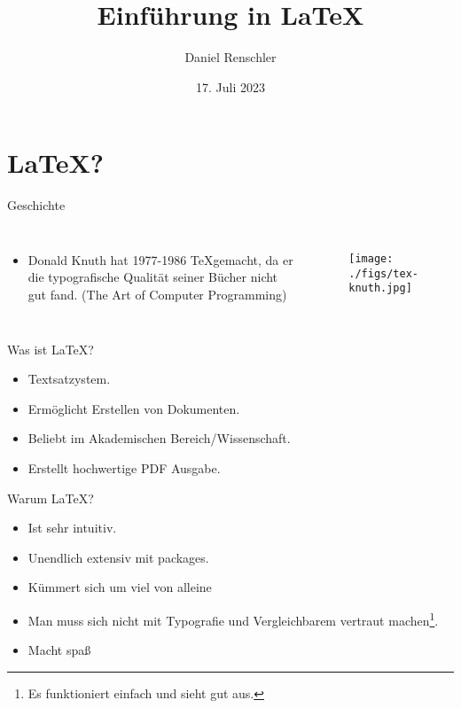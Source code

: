 \documentclass{beamer}
\title{Einf\"uhrung in \LaTeX}
\author{Daniel Renschler}
\date{17. Juli 2023}
\begin{document}
\begin{frame}
    \titlepage 
\end{frame}


\begin{frame}
    \tableofcontents
\end{frame}


\section{\LaTeX?}
\begin{frame}{Geschichte}
    \begin{columns}


    \begin{itemize}
        \item Donald Knuth hat 1977-1986 \TeX gemacht, da er die typografische Qualit\"at seiner B\"ucher nicht gut fand. (The Art of Computer Programming)

    \end{itemize}
        
        \hfill
        \begin{figure}[htpb]
            \centering
            \texttt{[image: ./figs/tex-knuth.jpg]}
        \end{figure}
    \end{columns}
\end{frame}

\begin{frame}{Was ist \LaTeX?}
    \begin{itemize}
        \item Textsatzystem.
        \item Erm\"oglicht Erstellen von Dokumenten.
        \item Beliebt im Akademischen Bereich/Wissenschaft.
        \item Erstellt hochwertige PDF Ausgabe.
    \end{itemize}
    
\end{frame}



\begin{frame}{Warum \LaTeX?}
    \begin{itemize}
        \item Ist sehr intuitiv.
        \item Unendlich extensiv mit packages.
        \item K\"ummert sich um viel von alleine
        \item Man muss sich nicht mit Typografie und Vergleichbarem vertraut machen\footnote{Es funktioniert einfach und sieht gut aus.}.
        \item Macht spa\ss
    \end{itemize}
\end{frame}
\end{document}
